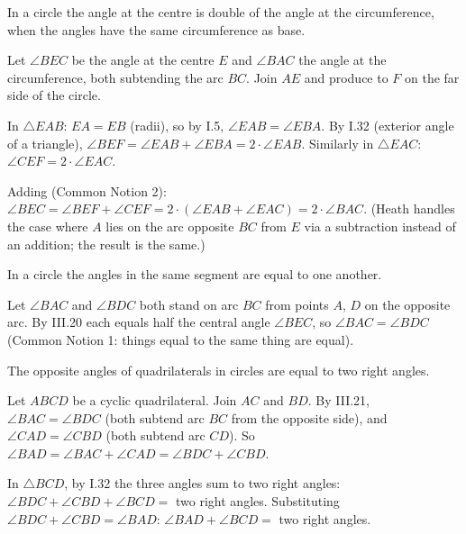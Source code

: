 \begin{claim}
\label{prop:III.20}
In a circle the angle at the centre is double of the angle at the
circumference, when the angles have the same circumference as base.
\end{claim}
\begin{evidence}
\label{ev:III.20}

Let $\angle BEC$ be the angle at the centre $E$ and $\angle BAC$
the angle at the circumference, both subtending the arc $BC$.
Join $AE$ and produce to $F$ on the far side of the circle.

In $\triangle EAB$: $EA = EB$ (radii), so by I.5, $\angle EAB =
\angle EBA$.  By I.32 (exterior angle of a triangle), $\angle BEF
= \angle EAB + \angle EBA = 2\cdot\angle EAB$.  Similarly in
$\triangle EAC$: $\angle CEF = 2\cdot\angle EAC$.

Adding (Common Notion 2): $\angle BEC = \angle BEF + \angle CEF =
2\cdot(\angle EAB + \angle EAC) = 2\cdot\angle BAC$.  (Heath
handles the case where $A$ lies on the arc opposite $BC$ from $E$
via a subtraction instead of an addition; the result is the same.)
\end{evidence}

\begin{claim}
\label{prop:III.21}
In a circle the angles in the same segment are equal to one another.
\end{claim}
\begin{evidence}
\label{ev:III.21}
Let $\angle BAC$ and $\angle BDC$ both stand on arc $BC$ from points
$A$, $D$ on the opposite arc.  By III.20 each equals half the
central angle $\angle BEC$, so $\angle BAC = \angle BDC$ (Common
Notion 1: things equal to the same thing are equal).
\end{evidence}

\begin{claim}
\label{prop:III.22}
The opposite angles of quadrilaterals in circles are equal to two
right angles.
\end{claim}
\begin{evidence}
\label{ev:III.22}
Let $ABCD$ be a cyclic quadrilateral.  Join $AC$ and $BD$.  By
III.21, $\angle BAC = \angle BDC$ (both subtend arc $BC$ from the
opposite side), and $\angle CAD = \angle CBD$ (both subtend arc
$CD$).  So $\angle BAD = \angle BAC + \angle CAD = \angle BDC +
\angle CBD$.

In $\triangle BCD$, by I.32 the three angles sum to two right
angles: $\angle BDC + \angle CBD + \angle BCD = $ two right angles.
Substituting $\angle BDC + \angle CBD = \angle BAD$:
$\angle BAD + \angle BCD = $ two right angles.
\end{evidence}


